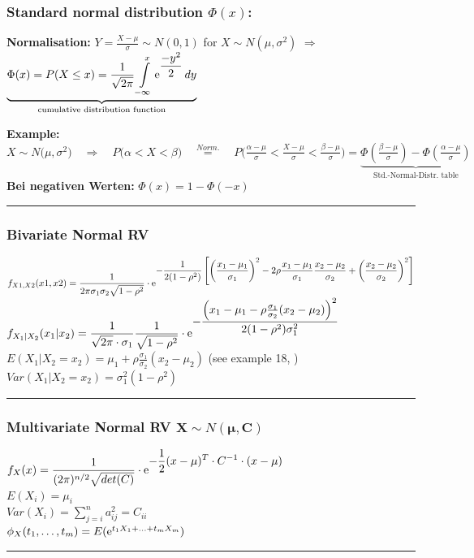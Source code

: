 \subsubsection{Standard normal distribution $\Phi(x)$:}

\textbf{Normalisation:} $Y=\frac{X-\mu}{\sigma}\sim N(0,1)$ \qquad for \qquad $X\sim N(\mu,\sigma^2)$ \qquad $\Rightarrow$ \qquad
$\underbrace{\Phi(x)=P(X\leq x)=\displaystyle\frac 1 {\sqrt{2\pi}}\int\limits_{-\infty}^x{\displaystyle\operatorname{\mathrm e}^{\displaystyle\frac{-y^2}{2}}dy} }_{\text{cumulative distribution function}}$\\

\vspace{0.5cm}

\textbf{Example:} $X\sim N\big(\mu,\sigma^2\big)\quad \Rightarrow \quad P\big(\alpha<X<\beta\big)\quad\overset{Norm.}{=}\quad P\big(\frac{\alpha-\mu}{\sigma}<\frac{X-\mu}{\sigma}<\frac{\beta-\mu}{\sigma}\big)=\underbrace{\Phi\left(\frac{\beta-\mu}{\sigma}\right)-\Phi\left(\frac{\alpha-\mu}{\sigma}\right)}\limits_{\text{Std.-Normal-Distr. table}}$\\
\textbf{Bei negativen Werten:} $\boxed{\Phi(x)=1-\Phi(-x)}$


\vspace{2mm}
\hrule

\subsubsection{Bivariate Normal RV }

$f_{X1,X2}(x1,x2)=\displaystyle\frac{1}{2\pi\sigma_1\sigma_2\sqrt{1-\rho^2}}\cdot\operatorname{\mathrm e}^{\displaystyle-\frac{1}{2(1-\rho^2)}\left[\left(\frac{x_1-\mu_1}{\sigma_1}\right)^2-2\rho\frac{x_1-\mu_1}{\sigma_1}\frac{x_2-\mu_2}{\sigma_2}+\left(\frac{x_2-\mu_2}{\sigma_2}\right)^2\right]}$\\

$f_{X_1|X_2}(x_1|x_2)=\displaystyle\frac{1}{\sqrt{2\pi}\cdot \sigma_1}\frac{1}{\sqrt{1-\rho^2}}\cdot\operatorname{\mathrm e}^{\displaystyle-\frac{\left(x_1-\mu_1-\rho\frac{\sigma_1}{\sigma_2}(x_2-\mu_2)\right)^2}{2(1-\rho^2)\sigma_1^2}}$\\

$E(X_1|X_2=x_2)=\mu_1+\rho\frac{\sigma_1}{\sigma_2}(x_2-\mu_2)$ (see example 18, )\\
$Var(X_1|X_2=x_2)=\sigma_1^2(1-\rho^2)$

\vspace{2mm}
\hrule

\subsubsection{Multivariate Normal RV $\mathbf{X} \sim N(\mathbf{\mu},\mathbf{C})$}
$f_X(x)=\displaystyle\frac{1}{(2\pi)^{n/2}\sqrt{det(C)}}\cdot\operatorname{\mathrm e}^{\displaystyle-\frac{1}{2}(x-\mu)^T\cdot C^{-1}\cdot(x-\mu)}$\\
$E(X_i)=\mu_i$\\
$Var(X_i)=\sum\limits_{j=i}^n{a_{ij}^2=C_{ii}}$\\
$\phi_X(t_1,\ldots,t_m)=E(\operatorname{\mathrm e}^{t_1X_1+\ldots+t_mX_m})$

\vspace{2mm}
\hrule
